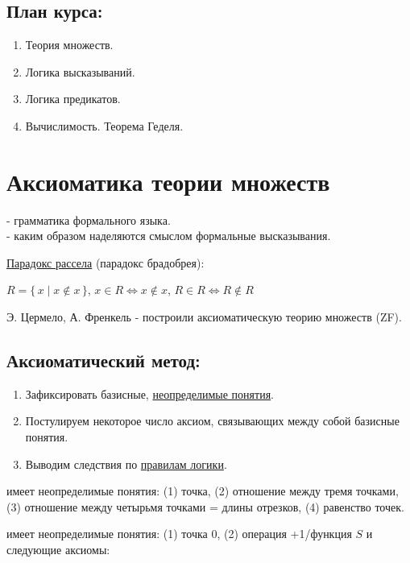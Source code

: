 \documentclass[12pt]{article}
\theoremstyle{definition}
\begin{document}
	
\subsection*{План курса:}	
\begin{enumerate}
	\item Теория множеств.
	\item Логика высказываний.
	\item Логика предикатов.
	\item Вычислимость. Теорема Геделя.
\end{enumerate}

\section*{Аксиоматика теории множеств}
 - грамматика формального языка.\\
 - каким образом наделяются смыслом формальные высказывания.

\underline{Парадокс рассела} (парадокс брадобрея):

$R = \{\,x \mid x \notin x\,\}$, $x \in R \Leftrightarrow x \notin x$, $R \in R \Leftrightarrow R \notin R$

Э. Цермело, А. Френкель - построили аксиоматическую теорию множеств (ZF).

\subsection*{Аксиоматический метод:}

\begin{enumerate}[label={(\arabic*)}]
	\item Зафиксировать базисные, \underline{неопределимые понятия}.
	\item Постулируем некоторое число аксиом, связывающих между собой базисные понятия.
	\item Выводим следствия по \underline{правилам логики}.
\end{enumerate}

 имеет неопределимые понятия: (1) точка, (2) отношение между тремя точками, (3) отношение между четырьмя точками = длины отрезков, (4) равенство точек.

 имеет неопределимые понятия: (1) точка 0, (2) операция +1/функция $S$ и следующие аксиомы:
\end{document}
